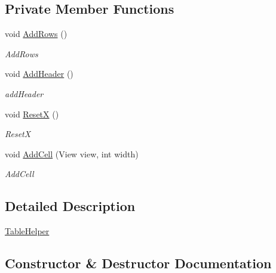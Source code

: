 \subsection*{Private Member Functions}
\begin{DoxyCompactItemize}
\item 
void \mbox{\hyperlink{class_gtd_app_1_1_console_core_1_1_views_1_1_helpers_1_1_table_helper_ab31ce00de23bd636829ca9f2bcbd1405}{Add\+Rows}} ()
\begin{DoxyCompactList}\small\item\em Add\+Rows \end{DoxyCompactList}\item 
void \mbox{\hyperlink{class_gtd_app_1_1_console_core_1_1_views_1_1_helpers_1_1_table_helper_addf12ce9e6c701ebd654f44620d3a7fa}{Add\+Header}} ()
\begin{DoxyCompactList}\small\item\em add\+Header \end{DoxyCompactList}\item 
void \mbox{\hyperlink{class_gtd_app_1_1_console_core_1_1_views_1_1_helpers_1_1_table_helper_a21bf95286d8d05c73e86e338e2fd6c22}{ResetX}} ()
\begin{DoxyCompactList}\small\item\em ResetX \end{DoxyCompactList}\item 
void \mbox{\hyperlink{class_gtd_app_1_1_console_core_1_1_views_1_1_helpers_1_1_table_helper_ad209d02b4cf70af1bec4623186ab0f00}{Add\+Cell}} (View view, int width)
\begin{DoxyCompactList}\small\item\em Add\+Cell \end{DoxyCompactList}\end{DoxyCompactItemize}


\subsection{Detailed Description}
\mbox{\hyperlink{class_gtd_app_1_1_console_core_1_1_views_1_1_helpers_1_1_table_helper}{Table\+Helper}} 



\subsection{Constructor \& Destructor Documentation}
\mbox{\label{class_gtd_app_1_1_console_core_1_1_views_1_1_helpers_1_1_table_helper_af50c8ec196e688b6bf75723c3336239a}} 
